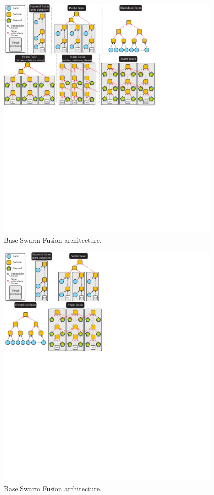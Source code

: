 \begin{figure}[tb]
 \includegraphics[width=\columnwidth]{figure/model.pdf}
 \caption{Base Swarm Fusion architecture.}\label{fig:base}
\end{figure}

\begin{figure}[tb]
 \includegraphics[width=\columnwidth]{figure/model2.pdf}
 \caption{Base Swarm Fusion architecture.}\label{fig:base}
\end{figure}


